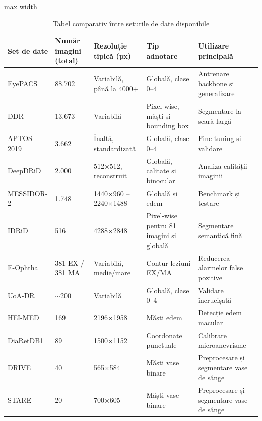 \documentclass[12pt, a4paper, oneside, romanian]{teza-upb}
\begin{document}
\begin{itemize}
\begin{itemize}
            \begin{table}[H]
            \centering
            \small
            \caption{Tabel comparativ între seturile de date disponibile}
            \label{tab:datasets-comparativ}
            \begin{adjustbox}{max width=\textwidth}
            \begin{tabular}{|p{2.6cm}|p{2.3cm}|p{3cm}|p{3.8cm}|p{4cm}|}
            \hline
            \textbf{Set de date} & \textbf{Număr imagini (total)} & \textbf{Rezoluție tipică (px)} & \textbf{Tip adnotare} & \textbf{Utilizare principală} \\
            \hline
            EyePACS & 88.702 & Variabilă, până la 4000+ & Globală, clase 0--4 & Antrenare backbone și generalizare \\
            \hline
            DDR & 13.673 & Variabilă & Pixel-wise, măști și bounding box & Segmentare la scară largă \\
            \hline
            APTOS 2019 & 3.662 & Înaltă, standardizată & Globală, clase 0--4 & Fine-tuning și validare \\
            \hline
            DeepDRiD & 2.000 & 512$\times$512, reconstruit & Globală, calitate și binocular & Analiza calității imaginii \\
            \hline
            MESSIDOR-2 & 1.748 & 1440$\times$960 -- 2240$\times$1488 & Globală și edem & Benchmark și testare \\
            \hline
            IDRiD & 516 & 4288$\times$2848 & Pixel-wise pentru 81 imagini și globală & Segmentare semantică fină \\
            \hline
            E-Ophtha & 381 EX / 381 MA & Variabilă, medie/mare & Contur leziuni EX/MA & Reducerea alarmelor false pozitive \\
            \hline
            UoA-DR & $\sim$200 & Variabilă & Globală, clase 0--4 & Validare încrucișată \\
            \hline
            HEI-MED & 169 & 2196$\times$1958 & Măști edem & Detecție edem macular \\
            \hline
            DiaRetDB1 & 89 & 1500$\times$1152 & Coordonate punctuale & Calibrare microanevrisme \\
            \hline
            DRIVE & 40 & 565$\times$584 & Măști vase binare & Preprocesare și segmentare vase de sânge \\
            \hline
            STARE & 20 & 700$\times$605 & Măști vase binare & Preprocesare și segmentare vase de sânge \\
            \hline
            \end{tabular}
            \end{adjustbox}
            \end{table}

        \end{itemize}
\end{itemize}
\end{document}

